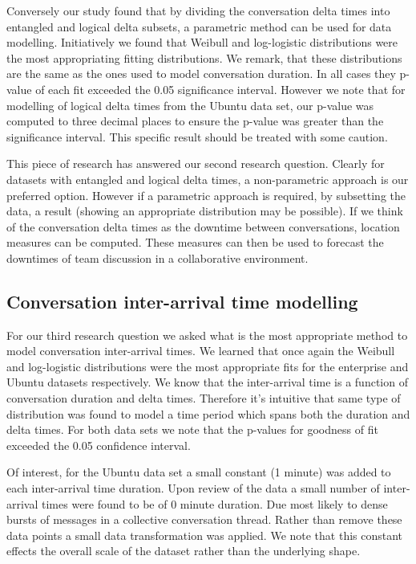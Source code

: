 \documentclass[conference]{IEEEtran}
\begin{document}
Conversely our study found that by dividing the conversation delta times into entangled and logical delta subsets, a parametric method can be used for data modelling. Initiatively we found that Weibull and log-logistic distributions were the most appropriating fitting distributions. We remark, that these distributions are the same as the ones used to model conversation duration. In all cases they p-value of each fit exceeded the 0.05 significance interval. However we note that for modelling of logical delta times from the Ubuntu data set, our p-value was computed to three decimal places to ensure the p-value was greater than the significance interval. This specific result should be treated with some caution.

This piece of research has answered our second research question. Clearly for datasets with entangled and logical delta times, a non-parametric approach is our preferred option. However if a parametric approach is required, by subsetting the data, a result (showing an appropriate distribution may be possible). If we think of the conversation delta times as the downtime between conversations, location measures can be computed. These measures can then be used to forecast the downtimes of team discussion in a collaborative environment.

\subsection{Conversation inter-arrival time modelling}

For our third research question we asked what is the most appropriate method to model conversation inter-arrival times. We learned that once again the Weibull and log-logistic distributions were the most appropriate fits for the enterprise and Ubuntu datasets respectively. We know that the inter-arrival time is a function of conversation duration and delta times. Therefore it's intuitive that same type of distribution was found to model a time period which spans both the duration and delta times. For both data sets we note that the p-values for goodness of fit exceeded the 0.05 confidence interval.

Of interest, for the Ubuntu data set a small constant (1 minute) was added to each inter-arrival time duration. Upon review of the data a small number of inter-arrival times were found to be of 0 minute duration. Due most likely to dense bursts of messages in a collective conversation thread. Rather than remove these data points a small data transformation was applied. We note that this constant effects the overall scale of the dataset rather than the underlying shape.
\end{document}
